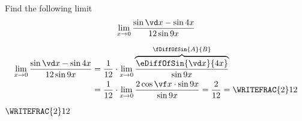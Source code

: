 



\MULTIPLY{}\vc
\ADD\vc\vb\vd
\ADD\vd\vb\ve
\DIVIDE{}\vf

\question[2] Find the following limit \[ \lim_{x\to 0}\dfrac{\sin\vd x - \sin\vb x}{\vj\sin\va x}\]

\watchout[-40pt]

\begin{solution}[\mcq]
  \begin{align}
    \lim_{x\to 0}\dfrac{\sin\vd x - \sin\vb x}{\vj\sin\va x} &=
    \dfrac{1}\vj\cdot\lim_{x\to 0}\overbrace{\dfrac{\eDiffOfSin{\vd x}{\vb x}}{\sin\va x}}^{
      \fDiffOfSin{A}{B}
    }\\
    &= \dfrac{1}\vj\cdot\lim_{x\to 0}\dfrac{2\cos\vf x\cdot\sin\va x}{\sin\va x} = \dfrac{2}\vj = \WRITEFRAC{2}\vj
  \end{align}
\end{solution}

\ifprintanswers\begin{codex}$\WRITEFRAC{2}\vj$\end{codex}\fi
